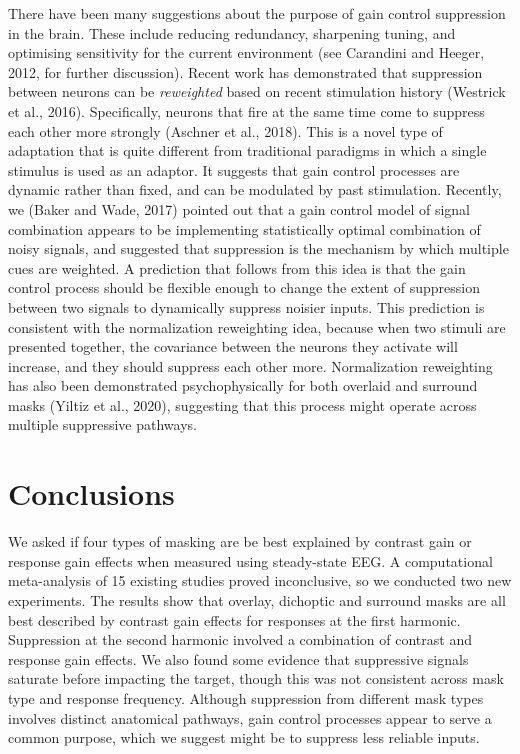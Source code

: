 \documentclass[]{article}
\begin{document}
There have been many suggestions about the purpose of gain control suppression in the brain. These include reducing redundancy, sharpening tuning, and optimising sensitivity for the current environment (see Carandini and Heeger, 2012, for further discussion). Recent work has demonstrated that suppression between neurons can be \emph{reweighted} based on recent stimulation history (Westrick et al., 2016). Specifically, neurons that fire at the same time come to suppress each other more strongly (Aschner et al., 2018). This is a novel type of adaptation that is quite different from traditional paradigms in which a single stimulus is used as an adaptor. It suggests that gain control processes are dynamic rather than fixed, and can be modulated by past stimulation. Recently, we (Baker and Wade, 2017) pointed out that a gain control model of signal combination appears to be implementing statistically optimal combination of noisy signals, and suggested that suppression is the mechanism by which multiple cues are weighted. A prediction that follows from this idea is that the gain control process should be flexible enough to change the extent of suppression between two signals to dynamically suppress noisier inputs. This prediction is consistent with the normalization reweighting idea, because when two stimuli are presented together, the covariance between the neurons they activate will increase, and they should suppress each other more. Normalization reweighting has also been demonstrated psychophysically for both overlaid and surround masks (Yiltiz et al., 2020), suggesting that this process might operate across multiple suppressive pathways.

\hypertarget{conclusions}{%
\section{Conclusions}\label{conclusions}}

We asked if four types of masking are be best explained by contrast gain or response gain effects when measured using steady-state EEG. A computational meta-analysis of 15 existing studies proved inconclusive, so we conducted two new experiments. The results show that overlay, dichoptic and surround masks are all best described by contrast gain effects for responses at the first harmonic. Suppression at the second harmonic involved a combination of contrast and response gain effects. We also found some evidence that suppressive signals saturate before impacting the target, though this was not consistent across mask type and response frequency. Although suppression from different mask types involves distinct anatomical pathways, gain control processes appear to serve a common purpose, which we suggest might be to suppress less reliable inputs.
\end{document}
